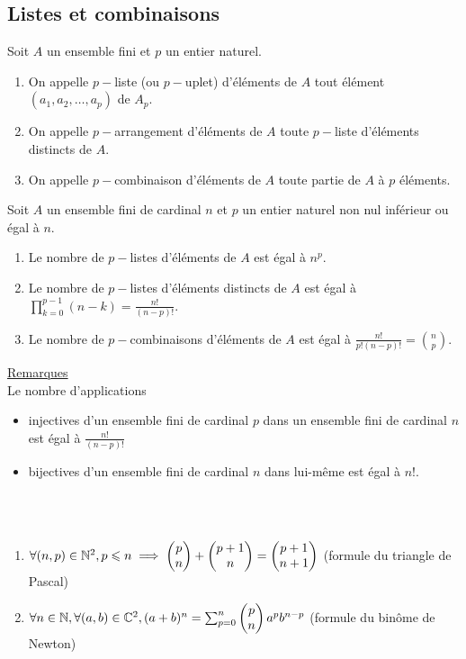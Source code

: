 \subsection{Listes et combinaisons}
\begin{defi}
    Soit \(A\) un ensemble fini et \(p\) un entier naturel.
    \begin{enumerate}
        \item On appelle \(p-\)liste (ou \(p-\)uplet) d’éléments de \(A\) tout élément \((a_1, a_2, \dots , a_p)\) de \(A_p\).
        \item On appelle \(p-\)arrangement d’éléments de \(A\) toute \(p-\)liste d’éléments distincts de \(A\).
        \item On appelle \(p-\)combinaison d’éléments de \(A\) toute partie de \(A\) à \(p\) éléments.
    \end{enumerate}
\end{defi}
\begin{prop}
    Soit \(A\) un ensemble fini de cardinal \(n\) et \(p\) un entier naturel non nul inférieur ou égal à \(n\).
    \begin{enumerate}
        \item Le nombre de \(p-\)listes d’éléments de \(A\) est égal à \(n^p\).
        \item Le nombre de \(p-\)listes d’éléments distincts de \(A\) est égal à \(\prod^{p-1}_{k=0}(n - k)= \frac{n!}{(n - p)!}\).
        \item Le nombre de \(p-\)combinaisons d’éléments de \(A\) est égal à \(\frac{n!}{p!(n - p)!} =\binom{n}{p}\).
    \end{enumerate}
    \underline{Remarques}\\
    Le nombre d’applications
    \begin{itemize}
        \item injectives d’un ensemble fini de cardinal \(p\) dans un ensemble fini de cardinal \(n\) est égal à \(\frac{n!}{(n - p)!}\)
        \item bijectives d’un ensemble fini de cardinal \(n\) dans lui-même est égal à \(n!\).
    \end{itemize}
\end{prop}
\begin{defprop}
    ~\\
    ~\\
    \begin{enumerate}
        \item \(\forall(n, p) \in \N^2, p \leq n \imp \binom{n}{p} + \binom{n}{p+1} = \binom{n+1}{p+1} \) \hfill (formule du triangle de Pascal)
        \item \(\forall n \in \N, \forall(a, b) \in \C^2, (a + b)^n =\sum^n_{p=0}\binom{n}{p}a^pb^{n-p}\) \hfill (formule du binôme de Newton)
    \end{enumerate}
\end{defprop}

